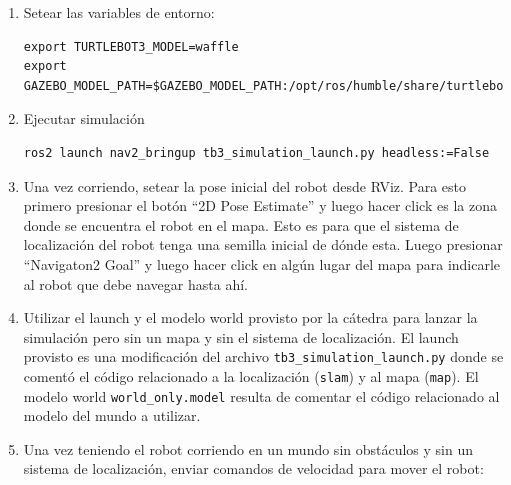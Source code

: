 \documentclass[tp]{lcc}
\begin{document}
\begin{enumerate}

\item Setear las variables de entorno:

\begin{lstlisting}[style=bash] 
export TURTLEBOT3_MODEL=waffle
export GAZEBO_MODEL_PATH=$GAZEBO_MODEL_PATH:/opt/ros/humble/share/turtlebot3_gazebo/models
\end{lstlisting}
	\item Ejecutar simulación

\begin{lstlisting}[style=bash] 
ros2 launch nav2_bringup tb3_simulation_launch.py headless:=False
\end{lstlisting}


	\item Una vez corriendo, setear la pose inicial del robot desde RViz. Para esto primero presionar el botón ``2D Pose Estimate'' y luego hacer click es la zona donde se encuentra el robot en el mapa. Esto es para que el sistema de localización del robot tenga una semilla inicial de dónde esta. Luego presionar ``Navigaton2 Goal'' y luego hacer click en algún lugar del mapa para indicarle al robot que debe navegar hasta ahí.

	
	\item Utilizar el launch y el modelo world provisto por la cátedra  para lanzar la simulación pero sin un mapa y sin el sistema de localización. El launch provisto es una modificación del  archivo \lstinline[style=bash]{tb3_simulation_launch.py} donde se comentó el código relacionado a la localización (\lstinline[style=bash]{slam}) y al mapa (\lstinline[style=bash]{map}). El modelo world \lstinline[style=bash]{world_only.model} resulta de comentar el código relacionado al modelo del mundo a utilizar.
	

	\item Una vez teniendo el robot corriendo en un mundo sin obstáculos y sin un sistema de localización, enviar comandos de velocidad para mover el robot:


\end{enumerate}
\end{document}
